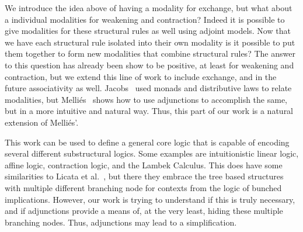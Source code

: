 We introduce the idea above of having a modality for exchange, but
what about a individual modalities for weakening and contraction?
Indeed it is possible to give modalities for these structural rules as
well using adjoint models.  Now that we have each structural rule
isolated into their own modality is it possible to put them together
to form new modalities that combine structural rules?  The answer to
this question has already been show to be positive, at least for
weakening and contraction, but we extend this line of work to include
exchange, and in the future associativity as well.
Jacobs~\cite{JACOBS199473} used monads and distributive laws to relate
modalities, but Melli{\'e}s~\cite{Mellies:2004} shows how to use
adjunctions to accomplish the same, but in a more intuitive and
natural way.  Thus, this part of our work is a natural extension of
Melli{\'e}s'.

This work can be used to define a general core logic that is capable
of encoding several different substructural logics.  Some examples are
intuitionistic linear logic, affine logic, contraction logic, and the
Lambek Calculus.  This does have some similarities to Licata et
al.~\cite{licata2017fibrational}, but there they embrace the tree
based structures with multiple different branching node for contexts
from the logic of bunched implications.  However, our work is trying
to understand if this is truly necessary, and if adjunctions provide a
means of, at the very least, hiding these multiple branching nodes.
Thus, adjunctions may lead to a simplification.

